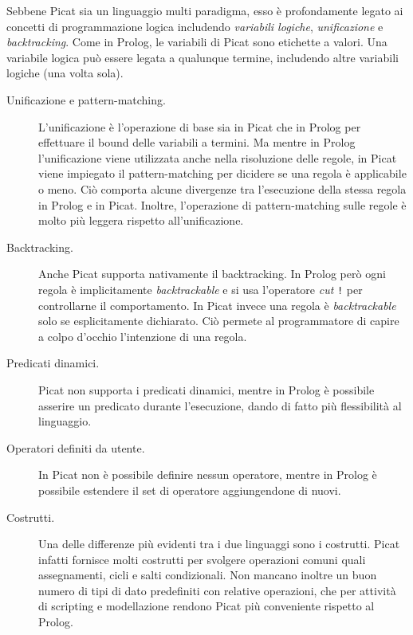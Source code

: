 \documentclass[12pt,a4paper,openright]{book} %
\begin{document}
Sebbene Picat sia un linguaggio multi paradigma, esso è profondamente
legato ai concetti di programmazione logica includendo \emph{variabili
  logiche}, \emph{unificazione} e \emph{backtracking}.  Come in
Prolog, le variabili di Picat sono etichette a valori. Una variabile
logica può essere legata a qualunque termine, includendo altre
variabili logiche (una volta sola).

\begin{description}
\item[Unificazione e pattern-matching.] L'unificazione è l'operazione
  di base sia in Picat che in Prolog per effettuare il bound delle
  variabili a termini. Ma mentre in Prolog l'unificazione viene
  utilizzata anche nella risoluzione delle regole, in Picat viene
  impiegato il pattern-matching per dicidere se una regola è
  applicabile o meno. Ciò comporta alcune divergenze tra l'esecuzione
  della stessa regola in Prolog e in Picat.  Inoltre, l'operazione di
  pattern-matching sulle regole è molto più leggera rispetto
  all'unificazione.
\item[Backtracking.] Anche Picat supporta nativamente il
  backtracking. In Prolog però ogni regola è implicitamente
  \emph{backtrackable} e si usa l'operatore \emph{cut} \verb|!| per
  controllarne il comportamento. In Picat invece una regola è
  \emph{backtrackable} solo se esplicitamente dichiarato. Ciò permete
  al programmatore di capire a colpo d'occhio l'intenzione di una
  regola.
\item[Predicati dinamici.] Picat non supporta i predicati dinamici,
  mentre in Prolog è possibile asserire un predicato durante
  l'esecuzione, dando di fatto più flessibilità al linguaggio.
\item[Operatori definiti da utente.] In Picat non è possibile definire
  nessun operatore, mentre in Prolog è possibile estendere il set di
  operatore aggiungendone di nuovi.
\item[Costrutti.] Una delle differenze più evidenti tra i due
  linguaggi sono i costrutti. Picat infatti fornisce molti costrutti
  per svolgere operazioni comuni quali assegnamenti, cicli e salti
  condizionali. Non mancano inoltre un buon numero di tipi di dato
  predefiniti con relative operazioni, che per attività di scripting e
  modellazione rendono Picat più conveniente rispetto al Prolog.
\end{description}



\end{document}
